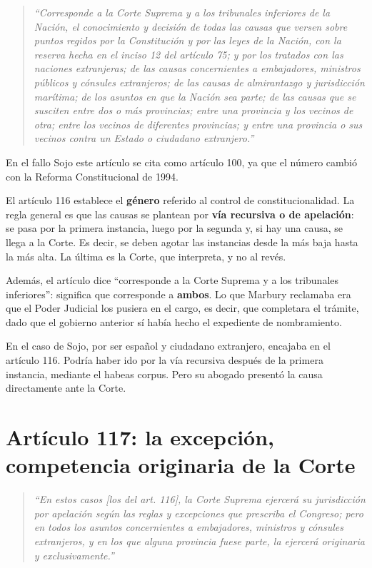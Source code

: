 \documentclass[12pt,oneside,a4paper]{book}
\begin{document}
\begin{quote}
\textit{``Corresponde a la Corte Suprema y a los tribunales inferiores de la Nación, el conocimiento y decisión de todas las causas que versen sobre puntos regidos por la Constitución y por las leyes de la Nación, con la reserva hecha en el inciso 12 del artículo 75; y por los tratados con las naciones extranjeras; de las causas concernientes a embajadores, ministros públicos y cónsules extranjeros; de las causas de almirantazgo y jurisdicción marítima; de los asuntos en que la Nación sea parte; de las causas que se susciten entre dos o más provincias; entre una provincia y los vecinos de otra; entre los vecinos de diferentes provincias; y entre una provincia o sus vecinos contra un Estado o ciudadano extranjero.''}
\end{quote}

\begin{note}
En el fallo Sojo este artículo se cita como artículo 100, ya que el número cambió con la Reforma Constitucional de 1994.
\end{note}

El artículo 116 establece el \textbf{género} referido al control de constitucionalidad. La regla general es que las causas se plantean por \textbf{vía recursiva o de apelación}: se pasa por la primera instancia, luego por la segunda y, si hay una causa, se llega a la Corte. Es decir, se deben agotar las instancias desde la más baja hasta la más alta. La última es la Corte, que interpreta, y no al revés.

Además, el artículo dice ``corresponde a la Corte Suprema y a los tribunales inferiores'': significa que corresponde a \textbf{ambos}. Lo que Marbury reclamaba era que el Poder Judicial los pusiera en el cargo, es decir, que completara el trámite, dado que el gobierno anterior sí había hecho el expediente de nombramiento.

En el caso de Sojo, por ser español y ciudadano extranjero, encajaba en el artículo 116. Podría haber ido por la vía recursiva después de la primera instancia, mediante el habeas corpus. Pero su abogado presentó la causa directamente ante la Corte.

\section{Artículo 117: la excepción, competencia originaria de la Corte}

\begin{quote}
\textit{``En estos casos [los del art. 116], la Corte Suprema ejercerá su jurisdicción por apelación según las reglas y excepciones que prescriba el Congreso; pero en todos los asuntos concernientes a embajadores, ministros y cónsules extranjeros, y en los que alguna provincia fuese parte, la ejercerá originaria y exclusivamente.''}
\end{quote}
\end{document}
